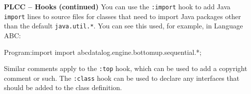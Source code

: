 \begin{minipage}[t]{\sw}
\slidenumber
\LARGE
{\bf PLCC -- Hooks (continued)}\exx
You can use the \verb':import' hook
to add Java \verb'import' lines to source files for classes
that need to import Java packages
other than the default \verb'java.util.*'.
You can see this used, for example, in Language ABC:
{\Large
\begin{qv}
Program:import
import abcdatalog.engine.bottomup.sequential.*;
\end{qv}
}
Similar comments apply to the \verb':top' hook,
which can be used
to add a copyright comment or such.\exx
The \verb':class' hook can be used to declare
any interfaces that should be added
to the class definition.
\end{minipage}
\clearpage
